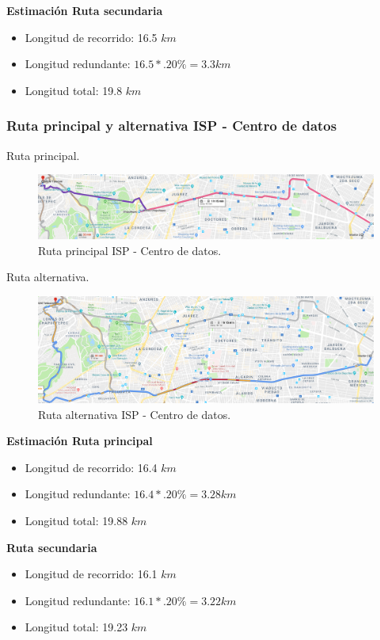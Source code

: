 \documentclass[12pt,letterpaper]{article}
\begin{document}
\textbf{Estimación Ruta secundaria}\\
\begin{itemize}
    \item Longitud de recorrido: 16.5 $km$
    \item Longitud redundante: $16.5*.20\%=3.3km$
    \item Longitud total: 19.8 $km$ 
\end{itemize}

\subsubsection{Ruta principal y alternativa ISP - Centro de datos}
Ruta principal.
\begin{figure}[ht]
    \centering
    \includegraphics[width=1\textwidth]{imagenes/f22.png}
    \caption{Ruta principal ISP - Centro de datos.}
\end{figure}

\newpage
Ruta alternativa.
\begin{figure}[ht]
    \centering
    \includegraphics[width=1\textwidth]{imagenes/f23.png}
    \caption{Ruta alternativa ISP - Centro de datos.}
\end{figure}

\textbf{Estimación Ruta principal}
\begin{itemize}
    \item Longitud de recorrido: 16.4 $km$
    \item Longitud redundante: $16.4*.20\%=3.28km$
    \item Longitud total: 19.88 $km$
\end{itemize}

\textbf{Ruta secundaria}
\begin{itemize}
    \item Longitud de recorrido: 16.1 $km$
    \item Longitud redundante: $16.1*.20\%=3.22km$
    \item Longitud total: 19.23 $km$ 
\end{itemize}
\end{document}
